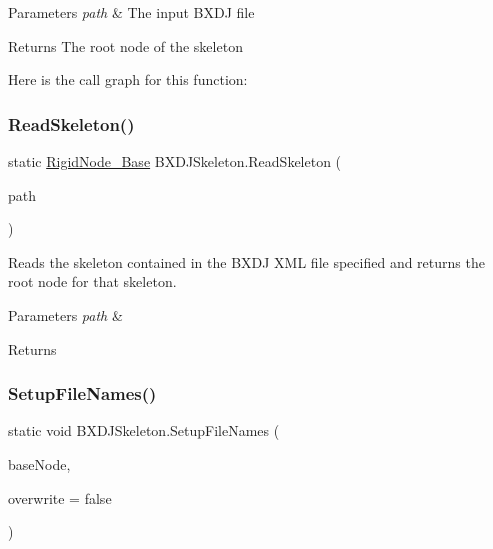 \begin{DoxyParams}{Parameters}
{\em path} & The input B\+X\+DJ file\\
\hline
\end{DoxyParams}
\begin{DoxyReturn}{Returns}
The root node of the skeleton
\end{DoxyReturn}
Here is the call graph for this function\+:
\mbox{\label{class_b_x_d_j_skeleton_a36b0456f8c3439733374cf05bb91e41f}} 
\subsubsection{\texorpdfstring{Read\+Skeleton()}{ReadSkeleton()}}
{\footnotesize\ttfamily static \hyperlink{class_rigid_node___base}{Rigid\+Node\+\_\+\+Base} B\+X\+D\+J\+Skeleton.\+Read\+Skeleton (\begin{DoxyParamCaption}\item[{string}]{path }\end{DoxyParamCaption})\hspace{0.3cm}{\ttfamily [static]}}



Reads the skeleton contained in the B\+X\+DJ X\+ML file specified and returns the root node for that skeleton. 


\begin{DoxyParams}{Parameters}
{\em path} & \\
\hline
\end{DoxyParams}
\begin{DoxyReturn}{Returns}

\end{DoxyReturn}
\mbox{\label{class_b_x_d_j_skeleton_abe03be6363ab87421b757bb83bf81d39}} 
\subsubsection{\texorpdfstring{Setup\+File\+Names()}{SetupFileNames()}}
{\footnotesize\ttfamily static void B\+X\+D\+J\+Skeleton.\+Setup\+File\+Names (\begin{DoxyParamCaption}\item[{\hyperlink{class_rigid_node___base}{Rigid\+Node\+\_\+\+Base}}]{base\+Node,  }\item[{bool}]{overwrite = {\ttfamily false} }\end{DoxyParamCaption})\hspace{0.3cm}{\ttfamily [static]}}



